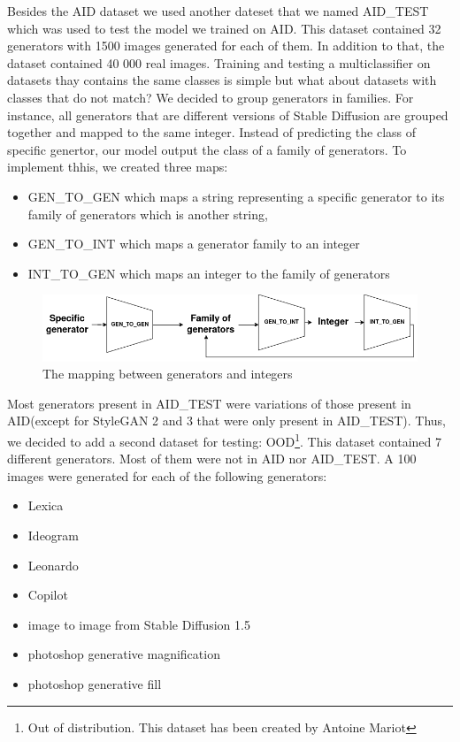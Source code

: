 \documentclass[12pt,a4paper]{article}
\begin{document}
Besides the AID dataset we used another dateset that we named AID\_TEST which was used to test the model we trained on AID. This dataset contained 32 generators with 1500 images generated for each of them. In addition to that, the dataset contained 40 000 real images. Training and testing a multiclassifier on datasets thay contains the same classes is simple but what about datasets with classes that do not match? We decided to group generators in families. For instance, all generators that are different versions of Stable Diffusion are grouped together and mapped to the same integer. Instead of predicting the class of specific genertor, our model output the class of a family of generators. To implement thhis, we created three maps:
\begin{itemize}
    \item GEN\_TO\_GEN which maps a string representing a specific generator to its family of generators which is another string,
    \item GEN\_TO\_INT which maps a generator family to an integer
    \item INT\_TO\_GEN which maps an integer to the family of generators
\end{itemize}
\begin{figure}[H]
    \includegraphics*[width=\textwidth]{img/maps.png}
    \caption{The mapping between generators and integers}
\end{figure}

Most generators present in AID\_TEST were variations of those present in AID(except for StyleGAN 2 and 3 that were only present in AID\_TEST). Thus, we decided to add a second dataset for testing: OOD\footnote{Out of distribution. This dataset has been created by Antoine Mariot}. This dataset contained 7 different generators. Most of them were not in AID nor AID\_TEST. A 100 images were generated for each of the following generators: 
\begin{itemize}
    \item Lexica
    \item Ideogram
    \item Leonardo
    \item Copilot
    \item image to image from Stable Diffusion 1.5
    \item photoshop generative magnification
    \item photoshop generative fill
\end{itemize}
\end{document}
